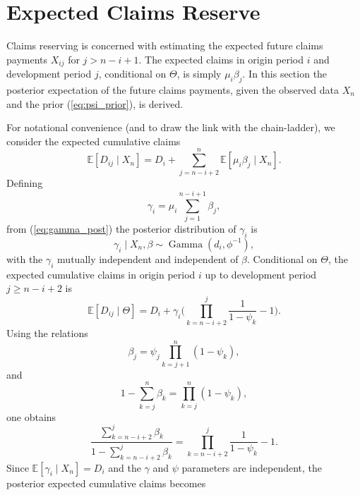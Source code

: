 \documentclass[aps,pre,draft]{revtex4-2}
\begin{document}
\section{Expected Claims Reserve}

Claims reserving is concerned with estimating the expected future claims payments $X_{ij}$ for $j>n-i+1$. The expected claims in origin period $i$ and development period $j$, conditional on $\Theta$, is simply $\mu_i\beta_j$. In this section the posterior expectation of the future claims payments, given the observed data $X_n$ and the prior (\ref{eq:psi_prior}), is derived.

For notational convenience (and to draw the link with the chain-ladder), we consider the expected cumulative claims
\begin{equation}\label{eq:expected_cum}
\mathbb{E}[D_{ij}\mid X_n]=D_i+\sum_{j=n-i+2}^{n}\mathbb{E}[\mu_i\beta_j\mid X_n].
\end{equation}
Defining
\begin{equation}\label{eq:gamma_def}
\gamma_i=\mu_i\sum_{j=1}^{n-i+1}\beta_j,
\end{equation}
from (\ref{eq:gamma_post}) the posterior distribution of $\gamma_i$ is
\begin{equation}\label{eq:gamma_posterior}
\gamma_i\mid X_n,\beta\sim \operatorname{Gamma}(d_i,\phi^{-1}),
\end{equation}
with the $\gamma_i$ mutually independent and independent of $\beta$. Conditional on $\Theta$, the expected cumulative claims in origin period $i$ up to development period $j\ge n-i+2$ is
\begin{equation}\label{eq:cum_expected_theta}
\mathbb{E}[D_{ij}\mid\Theta]=D_i+\gamma_i\Biggl(\prod_{k=n-i+2}^{j}\frac{1}{1-\psi_k}-1\Biggr).
\end{equation}
Using the relations
\begin{equation}\label{eq:beta_psi_relation}
\beta_j=\psi_j\prod_{k=j+1}^{n}(1-\psi_k),
\end{equation}
and
\begin{equation}\label{eq:complement}
1-\sum_{k=j}^{n}\beta_k=\prod_{k=j}^{n}(1-\psi_k),
\end{equation}
one obtains
\begin{equation}\label{eq:simplified_term}
\frac{\sum_{k=n-i+2}^{j}\beta_k}{1-\sum_{k=n-i+2}^{j}\beta_k}=\prod_{k=n-i+2}^{j}\frac{1}{1-\psi_k}-1.
\end{equation}
Since $\mathbb{E}[\gamma_i\mid X_n]=D_i$ and the $\gamma$ and $\psi$ parameters are independent, the posterior expected cumulative claims becomes
\end{document}
